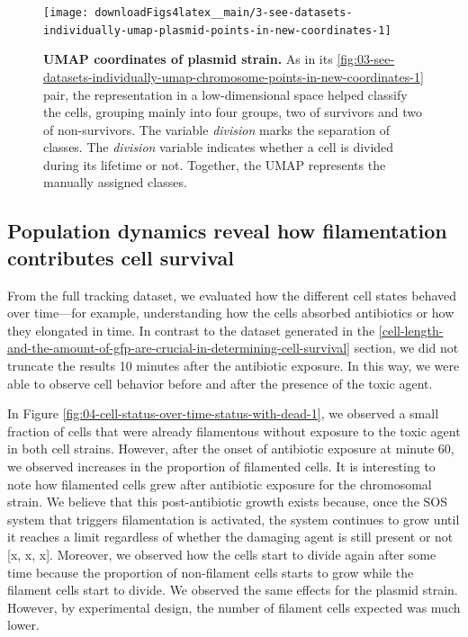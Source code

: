 \documentclass[a4paper, nobind]{templates/ociamthesis}
\begin{document}
\begin{figure}[H]
\texttt{[image: downloadFigs4latex\_\_main/3-see-datasets-individually-umap-plasmid-points-in-new-coordinates-1]} \caption[UMAP coordinates of plasmid strain.]{\textbf{UMAP coordinates of plasmid strain.} As in its \ref{fig:03-see-datasets-individually-umap-chromosome-points-in-new-coordinates-1} pair, the representation in a low-dimensional space helped classify the cells, grouping mainly into four groups, two of survivors and two of non-survivors. The variable \emph{division} marks the separation of classes. The \emph{division} variable indicates whether a cell is divided during its lifetime or not. Together, the UMAP represents the manually assigned classes.}\label{fig:3-see-datasets-individually-umap-plasmid-points-in-new-coordinates-1}
\end{figure}

\hypertarget{population-dynamics-reveal-how-filamentation-contributes-cell-survival}{%
\subsection{Population dynamics reveal how filamentation contributes cell survival}\label{population-dynamics-reveal-how-filamentation-contributes-cell-survival}}

From the full tracking dataset, we evaluated how the different cell states behaved over time---for example, understanding how the cells absorbed antibiotics or how they elongated in time.
In contrast to the dataset generated in the \ref{cell-length-and-the-amount-of-gfp-are-crucial-in-determining-cell-survival} section, we did not truncate the results 10 minutes after the antibiotic exposure.
In this way, we were able to observe cell behavior before and after the presence of the toxic agent.

In Figure \ref{fig:04-cell-status-over-time-status-with-dead-1}, we observed a small fraction of cells that were already filamentous without exposure to the toxic agent in both cell strains.
However, after the onset of antibiotic exposure at minute 60, we observed increases in the proportion of filamented cells.
It is interesting to note how filamented cells grew after antibiotic exposure for the chromosomal strain.
We believe that this post-antibiotic growth exists because, once the SOS system that triggers filamentation is activated, the system continues to grow until it reaches a limit regardless of whether the damaging agent is still present or not {[}x, x, x{]}.
Moreover, we observed how the cells start to divide again after some time because the proportion of non-filament cells starts to grow while the filament cells start to divide.
We observed the same effects for the plasmid strain.
However, by experimental design, the number of filament cells expected was much lower.
\end{document}
